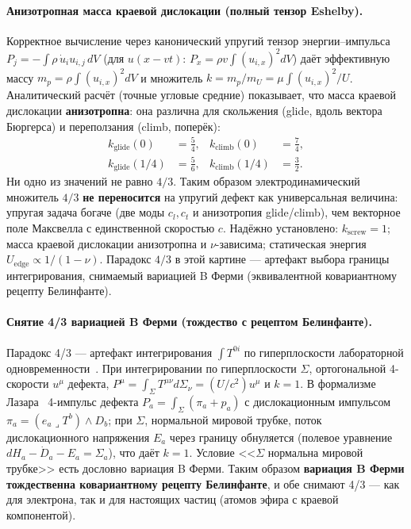\documentclass[11pt,a4paper]{article}
\begin{document}
\paragraph{Анизотропная масса краевой дислокации (полный тензор Eshelby).}
Корректное вычисление через канонический упругий тензор энергии--импульса
$P_j=-\int\rho\,\dot u_i u_{i,j}\,dV$ (для $u(x-vt)$:
$P_x=\rho v\int(u_{i,x})^2 dV$) даёт эффективную массу
$m_p=\rho\int(u_{i,x})^2 dV$ и множитель $k=m_p/m_U=\mu\int(u_{i,x})^2/U$.
Аналитический расчёт (точные угловые средние) показывает, что масса краевой
дислокации \textbf{анизотропна}: она различна для скольжения (glide, вдоль
вектора Бюргерса) и переползания (climb, поперёк):
\begin{align}
k_{\text{glide}}(0)&=\tfrac54, & k_{\text{climb}}(0)&=\tfrac74,\\
k_{\text{glide}}(1/4)&=\tfrac56, & k_{\text{climb}}(1/4)&=\tfrac32.
\end{align}
Ни одно из значений не равно $4/3$. Таким образом электродинамический
множитель $4/3$ \textbf{не переносится} на упругий дефект как универсальная
величина: упругая задача богаче (две моды $c_l,c_t$ и анизотропия
glide/climb), чем векторное поле Максвелла с единственной скоростью $c$.
Надёжно установлено: $k_{\text{screw}}=1$; масса краевой дислокации
анизотропна и $\nu$-зависима; статическая энергия $U_{\text{edge}}\propto
1/(1-\nu)$. Парадокс $4/3$ в этой картине --- артефакт выбора границы
интегрирования, снимаемый вариацией B Ферми (эквивалентной ковариантному
рецепту Белинфанте).

\paragraph{Снятие 4/3 вариацией B Ферми (тождество с рецептом Белинфанте).}
Парадокс 4/3 --- артефакт интегрирования $\int T^{0i}$ по гиперплоскости
лабораторной одновременности~\cite{Rohrlich}. При интегрировании по
гиперплоскости $\Sigma$, ортогональной 4-скорости $u^\mu$ дефекта,
$P^\mu=\int_\Sigma T^{\mu\nu}d\Sigma_\nu=(U/c^2)u^\mu$ и $k=1$. В формализме
Лазара~\cite{LazarDyn2010} 4-импульс дефекта $P_a=\int_\Sigma(\pi_a+p_a)$ с
дислокационным импульсом $\pi_a=(e_a\lrcorner T^b)\wedge D_b$; при $\Sigma$,
нормальной мировой трубке, поток дислокационного напряжения $E_a$ через
границу обнуляется (полевое уравнение $dH_a-\dot D_a-E_a=\Sigma_a$), что
даёт $k=1$. Условие <<$\Sigma$ нормальна мировой трубке>> есть дословно
вариация B Ферми. Таким образом \textbf{вариация B Ферми тождественна
ковариантному рецепту Белинфанте}, и обе снимают 4/3 --- как для электрона,
так и для настоящих частиц (атомов эфира с краевой компонентой).
\end{document}
